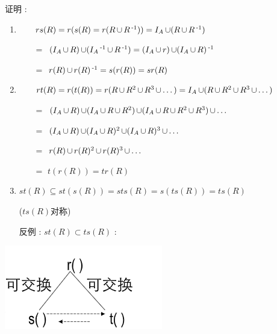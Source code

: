 {{{\begin{itemize}
{          证明 : \begin{enumerate}
            \item {
                  \begin{itemize}
                    \item[] $rs(R) = r(s(R) = r(R \operatorname{\cup} R\operatorname{^{-1}})) = I_A \operatorname{\cup} (R \operatorname{\cup} R\operatorname{^{-1}})$
                    \item[$=$] $(I_A \operatorname{\cup} R) \operatorname{\cup} (I_A\operatorname{^{-1}} \operatorname{\cup} R\operatorname{^{-1}}) = (I_A \operatorname{\cup} r) \operatorname{\cup} (I_A \operatorname{\cup} R)\operatorname{^{-1}}$
                    \item[$=$] $r(R) \operatorname{\cup} r(R)\operatorname{^{-1}} = s(r(R)) = sr(R)$
                  \end{itemize}
                  }
            \item {
                  \begin{itemize}
                    \item[] $rt(R) = r(t(R)) = r(R \operatorname{\cup} R^2 \operatorname{\cup} R^3 \operatorname{\cup} \dots) = I_A \operatorname{\cup} (R \operatorname{\cup} R^2 \operatorname{\cup} R^3 \operatorname{\cup} \dots)$
                    \item[$=$] $(I_A \operatorname{\cup} R)\operatorname{\cup}(I_A \operatorname{\cup} R \operatorname{\cup} R^2) \operatorname{\cup} (I_A \operatorname{\cup} R \operatorname{\cup} R^2 \operatorname{\cup} R^3) \operatorname{\cup} \dots$
                    \item[$=$] $(I_A \operatorname{\cup} R) \operatorname{\cup} (I_A \operatorname{\cup} R)^2 \operatorname{\cup} (I_A \operatorname{\cup} R)^3 \operatorname{\cup} \dots$
                    \item[$=$] $r(R) \operatorname{\cup} r(R)^2 \operatorname{\cup} r(R)^3 \operatorname{\cup} \dots$
                    \item[$=$] $t(r(R)) = tr(R)$
                  \end{itemize}
                  }
            \item {
                  $st(R) \subseteq st(s(R)) = sts(R) = s(ts(R)) = ts(R)$

                  ($ts(R)$对称)

                  反例 : $st(R) \subset ts(R)$ :
                  }
          \end{enumerate}
          }
  \end{itemize}

  \begin{center}
    \includegraphics{resources/closure_properties_example_1.png}
  \end{center}
}%

}}
